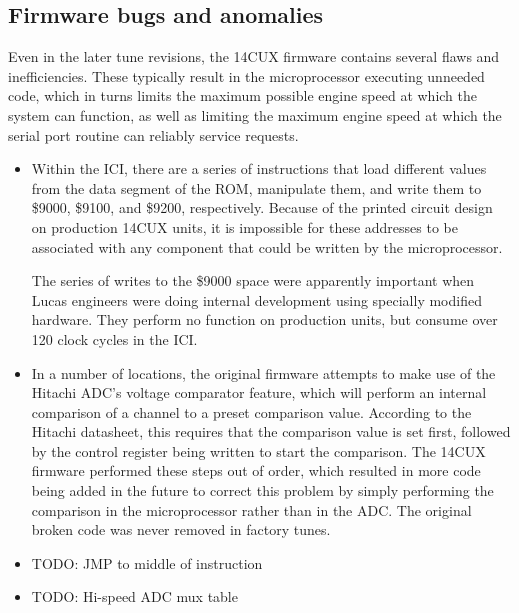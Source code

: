 \documentclass[11pt,twocolumn]{scrartcl}
\begin{document}
\subsection {Firmware bugs and anomalies}
Even in the later tune revisions, the 14CUX firmware contains several flaws and inefficiencies. These typically result in the microprocessor executing unneeded code, which in turns limits the maximum possible engine speed at which the system can function, as well as limiting the maximum engine speed at which the serial port routine can reliably service requests.
\begin{itemize}
\item Within the ICI, there are a series of instructions that load different values from the data segment of the ROM, manipulate them, and write them to \$9000, \$9100, and \$9200, respectively. Because of the printed circuit design on production 14CUX units, it is impossible for these addresses to be associated with any component that could be written by the microprocessor.

The series of writes to the \$9000 space were apparently important when Lucas engineers were doing internal development using specially modified hardware. They perform no function on production units, but consume over 120 clock cycles in the ICI.

\item In a number of locations, the original firmware attempts to make use of the Hitachi ADC's voltage comparator feature, which will perform an internal comparison of a channel to a preset comparison value. According to the Hitachi datasheet, this requires that the comparison value is set first, followed by the control register being written to start the comparison. The 14CUX firmware performed these steps out of order, which resulted in more code being added in the future to correct this problem by simply performing the comparison in the microprocessor rather than in the ADC. The original broken code was never removed in factory tunes.

\item TODO: JMP to middle of instruction
\item TODO: Hi-speed ADC mux table

\end{itemize}
\end{document}
